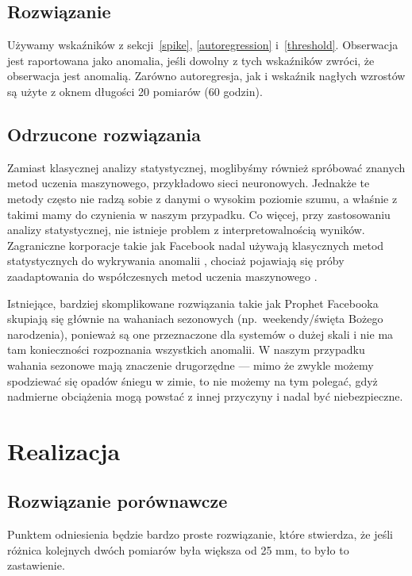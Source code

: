 \subsection{Rozwiązanie}\label{solution}
Używamy wskaźników z sekcji~\ref{spike}, \ref{autoregression} i~\ref{threshold}.
Obserwacja jest raportowana jako anomalia, jeśli dowolny z tych wskaźników zwróci, że obserwacja jest anomalią.
Zarówno autoregresja, jak i wskaźnik nagłych wzrostów są użyte z oknem długości 20 pomiarów (60 godzin).

\subsection{Odrzucone rozwiązania}\label{subsec:odrzucone-rozwiazania}
Zamiast klasycznej analizy statystycznej, moglibyśmy również spróbować znanych metod uczenia maszynowego, przykładowo sieci neuronowych.
Jednakże te metody często nie radzą sobie z danymi o wysokim poziomie szumu, a właśnie z takimi mamy do czynienia w naszym przypadku.
Co więcej, przy zastosowaniu analizy statystycznej, nie istnieje problem z interpretowalnością wyników.
Zagraniczne korporacje takie jak Facebook nadal używają klasycznych metod statystycznych do wykrywania anomalii \cite{Prophet}, chociaż pojawiają się próby zaadaptowania do współczesnych metod uczenia maszynowego \cite{Neuralprophet}.

Istniejące, bardziej skomplikowane rozwiązania takie jak Prophet Facebooka~\cite{Prophet} skupiają się głównie na wahaniach sezonowych (np.\ weekendy/święta Bożego narodzenia), ponieważ są one przeznaczone dla systemów o dużej skali i nie ma tam konieczności rozpoznania wszystkich anomalii.
W naszym przypadku wahania sezonowe mają znaczenie drugorzędne — mimo że zwykle możemy spodziewać się opadów śniegu w zimie, to nie możemy na tym polegać, gdyż nadmierne obciążenia mogą powstać z innej przyczyny i nadal być niebezpieczne.


\section{Realizacja}

\subsection{Rozwiązanie porównawcze}
Punktem odniesienia będzie bardzo proste rozwiązanie, które stwierdza, że jeśli różnica kolejnych dwóch pomiarów była większa od 25 mm, to było to zastawienie.

